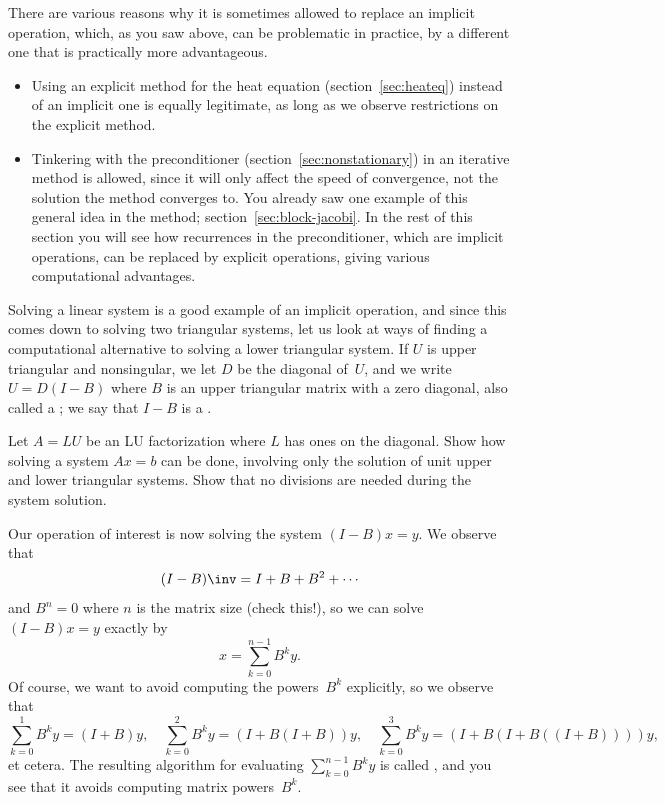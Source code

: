 There are various reasons why it is sometimes allowed to replace an
implicit operation, which, as you saw above, can be problematic in
practice, by a different one that is practically more advantageous.
\begin{itemize}
\item Using an explicit method for the heat equation
  (section~\ref{sec:heateq}) instead of an implicit one is equally
  legitimate, as long as we observe  restrictions
  on the explicit method.
\item Tinkering with the preconditioner
  (section~\ref{sec:nonstationary}) in an iterative method is allowed,
  since it will only affect the speed of convergence, not the solution
  the method converges to. You already saw one example of this general
  idea in the  method;
  section~\ref{sec:block-jacobi}. In the rest of this section you will
  see how recurrences in the preconditioner, which are implicit
  operations, can be replaced by explicit operations, giving various
  computational advantages.
\end{itemize}

Solving a linear system is a good example of an implicit operation,
and since this comes down to solving two triangular systems, let us
look at ways of finding a computational alternative to solving a lower
triangular system. If $U$ is upper triangular and nonsingular, we let
$D$ be the diagonal of~$U$, and we write $U=D(I-B)$ where $B$ is an
upper triangular matrix with a zero diagonal, also called a
; we say that $I-B$ is
a .

\begin{exercise}
  Let $A=LU$ be an LU factorization where $L$ has ones on the
  diagonal. Show how solving a system $Ax=b$ can be done, involving
  only the solution of unit upper and lower triangular systems. Show
  that no divisions are needed during the system solution.
\end{exercise}

Our operation of interest is now solving the system $(I-B)x=y$. We
observe that
\begin{equation}
  (I-B)\inv = I+B+B^2+\cdots
  \label{eq:neuman-series}
\end{equation}
and $B^n=0$ where $n$ is the matrix size (check
this!), so we can solve $(I-B) x = y$ exactly by 
\[ x = \sum_{k=0}^{n-1}B^k y. \]
Of course, we want to avoid computing the powers~$B^k$ explicitly, so
we observe that
\begin{equation}
 \sum_{k=0}^1B^ky = (I+B)y,\quad \sum_{k=0}^2B^ky =
 (I+B(I+B))y,\quad \sum_{k=0}^3B^ky = (I+B(I+B((I+B))))y,
 \label{eq:horner}
\end{equation}
et cetera.
The resulting algorithm for evaluating $\sum_{k=0}^{n-1}B^k y$ is
called , and you see that it avoids computing
matrix powers~$B^k$.

